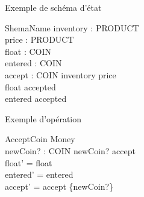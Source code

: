\documentclass[12pt]{article}
\begin{document}
Exemple de schéma d'état
\begin{schema}{ShemaName}
  inventory : \bag PRODUCT\\
  price : PRODUCT \pfun \nat\\
  float : \bag COIN\\
  entered : \bag COIN\\
  accept : \power COIN
  \where
  \dom inventory \subseteq \dom price\\
  \dom float \subseteq accepted\\
  \dom entered \subseteq accepted
\end{schema}

Exemple d'opération
\begin{schema}{AcceptCoin}
\Delta Money\\
newCoin? : COIN
\where
newCoin? \notin accept\\
float' = float\\
entered' = entered\\
accept' = accept \cup \{newCoin?\}
\end{schema}
\end{document}
